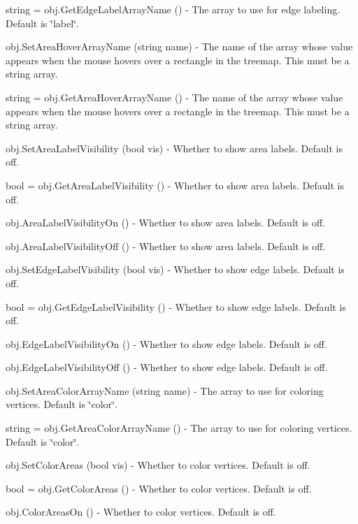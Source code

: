 \begin{DoxyItemize}
\item {\ttfamily string = obj.\-Get\-Edge\-Label\-Array\-Name ()} -\/ The array to use for edge labeling. Default is \char`\"{}label\char`\"{}.  
\item {\ttfamily obj.\-Set\-Area\-Hover\-Array\-Name (string name)} -\/ The name of the array whose value appears when the mouse hovers over a rectangle in the treemap. This must be a string array.  
\item {\ttfamily string = obj.\-Get\-Area\-Hover\-Array\-Name ()} -\/ The name of the array whose value appears when the mouse hovers over a rectangle in the treemap. This must be a string array.  
\item {\ttfamily obj.\-Set\-Area\-Label\-Visibility (bool vis)} -\/ Whether to show area labels. Default is off.  
\item {\ttfamily bool = obj.\-Get\-Area\-Label\-Visibility ()} -\/ Whether to show area labels. Default is off.  
\item {\ttfamily obj.\-Area\-Label\-Visibility\-On ()} -\/ Whether to show area labels. Default is off.  
\item {\ttfamily obj.\-Area\-Label\-Visibility\-Off ()} -\/ Whether to show area labels. Default is off.  
\item {\ttfamily obj.\-Set\-Edge\-Label\-Visibility (bool vis)} -\/ Whether to show edge labels. Default is off.  
\item {\ttfamily bool = obj.\-Get\-Edge\-Label\-Visibility ()} -\/ Whether to show edge labels. Default is off.  
\item {\ttfamily obj.\-Edge\-Label\-Visibility\-On ()} -\/ Whether to show edge labels. Default is off.  
\item {\ttfamily obj.\-Edge\-Label\-Visibility\-Off ()} -\/ Whether to show edge labels. Default is off.  
\item {\ttfamily obj.\-Set\-Area\-Color\-Array\-Name (string name)} -\/ The array to use for coloring vertices. Default is \char`\"{}color\char`\"{}.  
\item {\ttfamily string = obj.\-Get\-Area\-Color\-Array\-Name ()} -\/ The array to use for coloring vertices. Default is \char`\"{}color\char`\"{}.  
\item {\ttfamily obj.\-Set\-Color\-Areas (bool vis)} -\/ Whether to color vertices. Default is off.  
\item {\ttfamily bool = obj.\-Get\-Color\-Areas ()} -\/ Whether to color vertices. Default is off.  
\item {\ttfamily obj.\-Color\-Areas\-On ()} -\/ Whether to color vertices. Default is off.  

\end{DoxyItemize}

